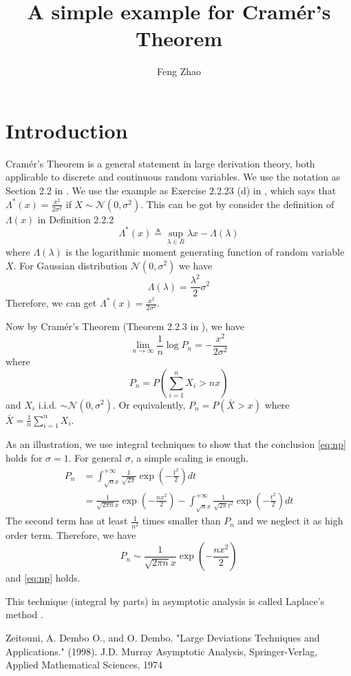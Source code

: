 \documentclass{article}
\title{A simple example for Cramér's Theorem}
\author{Feng Zhao}
\date
\begin{document}
\maketitle

\section{Introduction}
Cramér's Theorem is a general statement in large
derivation theory, both applicable to discrete and
continuous random variables. We use the notation
as Section 2.2 in \cite{dd}.
We use the example as Exercise 2.2.23 (d) in
\cite{dd},
which says that $\Lambda^*(x) = \frac{x^2}{2\sigma^2}$
if $X \sim \mathcal{N}(0, \sigma^2)$.
This can be got by consider the definition of
$\Lambda(x)$ in Definition 2.2.2
$$
\Lambda^*(x) \triangleq \sup_{\lambda \in R} \lambda x - \Lambda(\lambda)
$$
where $\Lambda(\lambda)$ is the logarithmic moment generating function of random variable $X$.
For Gaussian distribution $\mathcal{N}(0, \sigma^2)$ we have
$$
\Lambda(\lambda) = \frac{\lambda^2}{2}\sigma^2
$$
Therefore, we can get $\Lambda^*(x) = \frac{x^2}{2\sigma^2}$.

Now by Cramér's Theorem (Theorem 2.2.3 in \cite{dd}),
we have
\begin{equation}\label{eq:np}
\lim_{n\to \infty} \frac{1}{n}\log P_n = -\frac{x^2}{2\sigma^2}
\end{equation}
where
$$
P_n = P(\sum_{i=1}^n X_i > nx)
$$
and $X_i$ i.i.d. $\sim \mathcal{N}(0, \sigma^2)$.
Or equivalently, $P_n = P(\bar{X}>x)$ where
$\bar{X} = \frac{1}{n} \sum_{i=1}^n X_i$.

As an illustration, we use integral techniques to
show that the conclusion \eqref{eq:np} holds for
$\sigma = 1$. For general $\sigma$, a simple
scaling is enough.
\begin{align*}
P_n &= \int_{\sqrt{n}x}^{+\infty} \frac{1}{\sqrt{2\pi}}
\exp(-\frac{t^2}{2})dt \\
&= \frac{1}{\sqrt{2\pi n}x}\exp(-\frac{nx^2}{2})
- \int_{\sqrt{n}x}^{+\infty} \frac{1}{\sqrt{2\pi}t^2}
\exp(-\frac{t^2}{2})dt
\end{align*}
The second term has at least $\frac{1}{n^2}$ times
smaller than $P_n$ and we neglect it as high order term. Therefore, we have
$$
P_n \sim \frac{1}{\sqrt{2\pi n}x}\exp(-\frac{nx^2}{2})
$$
and \eqref{eq:np} holds.

This technique (integral by parts) in asymptotic analysis is called Laplace's method \cite{aa}.
\begin{thebibliography}{9}
 Zeitouni, A. Dembo O., and O. Dembo. "Large Deviations Techniques and Applications." (1998).
 J.D. Murray Asymptotic Analysis, Springer-Verlag, Applied Mathematical Sciences,
1974
\end{thebibliography}
\end{document}
